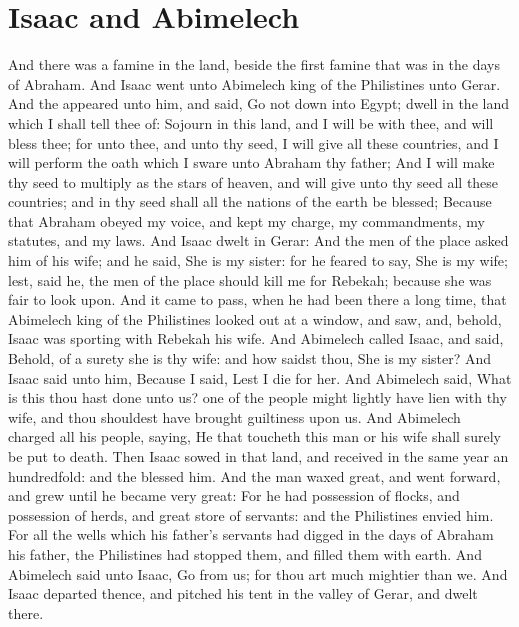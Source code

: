 \section*{Isaac and Abimelech}
\begin{biblechapter} %
\verse And there was a famine in the land, beside the first famine that was in the days of Abraham. And Isaac went unto Abimelech king of the Philistines unto Gerar.
\verse And the \LORD appeared unto him, and said, Go not down into Egypt; dwell in the land which I shall tell thee of:
\verse Sojourn in this land, and I will be with thee, and will bless thee; for unto thee, and unto thy seed, I will give all these countries, and I will perform the oath which I sware unto Abraham thy father;
\verse And I will make thy seed to multiply as the stars of heaven, and will give unto thy seed all these countries; and in thy seed shall all the nations of the earth be blessed;
\verse Because that Abraham obeyed my voice, and kept my charge, my commandments, my statutes, and my laws.
\verse And Isaac dwelt in Gerar:
\verse And the men of the place asked him of his wife; and he said, She is my sister: for he feared to say, She is my wife; lest, said he, the men of the place should kill me for Rebekah; because she was fair to look upon.
\verse And it came to pass, when he had been there a long time, that Abimelech king of the Philistines looked out at a window, and saw, and, behold, Isaac was sporting with Rebekah his wife.
\verse And Abimelech called Isaac, and said, Behold, of a surety she is thy wife: and how saidst thou, She is my sister? And Isaac said unto him, Because I said, Lest I die for her.
\verse And Abimelech said, What is this thou hast done unto us? one of the people might lightly have lien with thy wife, and thou shouldest have brought guiltiness upon us.
\verse And Abimelech charged all his people, saying, He that toucheth this man or his wife shall surely be put to death.
\verse Then Isaac sowed in that land, and received in the same year an hundredfold: and the \LORD blessed him.
\verse And the man waxed great, and went forward, and grew until he became very great:
\verse For he had possession of flocks, and possession of herds, and great store of servants: and the Philistines envied him.
\verse For all the wells which his father's servants had digged in the days of Abraham his father, the Philistines had stopped them, and filled them with earth.
\verse And Abimelech said unto Isaac, Go from us; for thou art much mightier than we.
\verse And Isaac departed thence, and pitched his tent in the valley of Gerar, and dwelt there.

\end{biblechapter}
